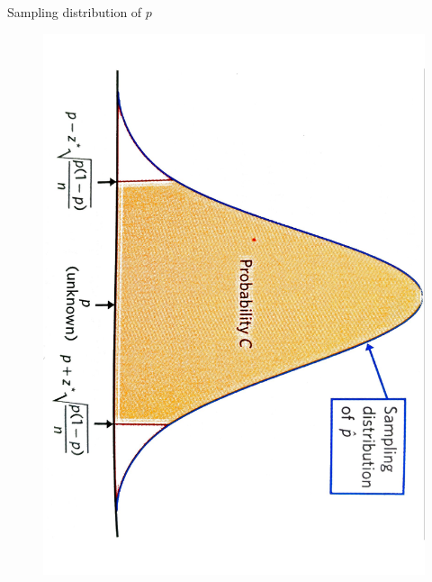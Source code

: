 \documentclass[handout]{beamer}\usepackage[]{graphicx}\usepackage[]{color}
\begin{document}
\begin{frame}{Sampling distribution of $p$}

\begin{center}
	\begin{figure}
\includegraphics[scale=0.3,angle=90]{prop1.pdf}
	\end{figure}
\end{center}

\end{frame}
\end{document}
